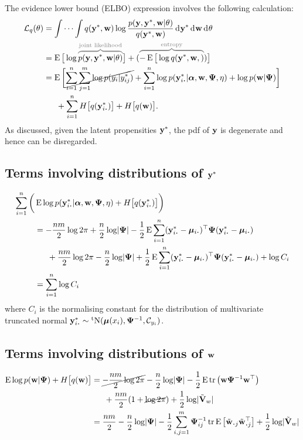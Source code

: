 The evidence lower bound (ELBO) expression involves the following calculation:
\begin{align*}
  \cL_q(\theta) &= \idotsint q(\by^*,\bw) 
  \log \frac{p(\by,\by^*,\bw|\theta)}{q(\by^*,\bw)}
  \dint\by^* \dint\bw \dint\theta \\
  &= \E \big[ \log \greyoverbrace{p(\by,\by^*,\bw|\theta)}{\text{joint likelihood}} \big]
  +
  (\greyoverbrace{-\E \big[ \log q(\by^*,\bw,)}{\text{entropy}}) \big] \\
  &= \E\bigg[
  \cancel{\sum_{i=1}^n \sum_{j=1}^m \log  p(y_{i}|y_{ij}^*)} + 
  \sum_{i=1}^n \log  p(\by_{i \bigcdot}^*|\balpha,\bw,\bPsi,\eta) +
  \log p(\bw|\bPsi)  
  \bigg] \\
  &\phantom{==} 
  + \sum_{i=1}^n H\big[q(\by^*_{i \bigcdot}) \big]
  + H\big[q(\bw) \big].
\end{align*}
As discussed, given the latent propensities ${\mathbf y}^*$, the pdf of ${\mathbf y}$ is degenerate and hence can be disregarded.  

\subsection{Terms involving distributions of \texorpdfstring{${\mathbf y}^*$}{$y^*$}}

\begin{align*}
  \sum_{i=1}^n  \bigg( &
  \E  \log p(\by_{i \bigcdot}^*|\balpha,\bw,\bPsi,\eta) 
  + H \big[q(\by^*_{i \bigcdot}) \big] 
  \bigg) \\
  &=  -\half[nm]\log 2\pi + \half[n] \log \abs{\bPsi} - \half \E \sum_{i=1}^n (\by^*_{i \bigcdot} - \bmu_{i \bigcdot})^\top \bPsi (\by^*_{i \bigcdot} - \bmu_{i \bigcdot}) \\
  &\phantom{==} +\half[nm]\log 2\pi - \half[n] \log \abs{\bPsi} + \half \E \sum_{i=1}^n (\by^*_{i \bigcdot} - \bmu_{i \bigcdot})^\top \bPsi (\by^*_{i \bigcdot} - \bmu_{i \bigcdot}) + \log C_i  \\
   &=\sum_{i=1}^n \log C_i 
\end{align*}
where $C_i$ is the normalising constant for the distribution of multivariate truncated normal $\by_{i \bigcdot}^* \sim \tN(\bmu(x_i),\bPsi^{-1},\cC_{y_i})$.

\subsection{Terms involving distributions of ${\mathbf w}$}

\begin{align*}
  \E \log p(\bw|\bPsi) + H \big[q(\bw) \big] 
  &= \cancel{-\half[nm]\log 2\pi} - \half[n]\log\abs{\bPsi} - \half\E\tr \big( \bw \bPsi^{-1} \bw^\top \big) \\
  &\phantom{==} + \half[nm](1 + \cancel{\log 2\pi}) + \half\log\abs{\tilde\bV_w} \\
  &=  \half[nm] - \half[n]\log\abs{\bPsi} 
  - \half \sum_{i,j=1}^m \bPsi^{-1}_{ij}  \tr \E \big[\tilde\bw_{\bigcdot j}\tilde\bw_{\bigcdot j}^\top\big]
  + \half\log\abs{\tilde\bV_w}
\end{align*}
